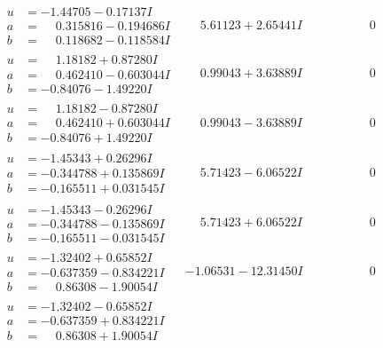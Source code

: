 \documentclass[1p]{elsarticle_modified}
\theoremstyle{definition}
\begin{document}
$$\begin{array}{c|c|c}
\begin{aligned}
u &= -1.44705 - 0.17137 I \\
a &= \phantom{-}0.315816 - 0.194686 I \\
b &= \phantom{-}0.118682 - 0.118584 I\end{aligned}
 & \phantom{-}5.61123 + 2.65441 I & \phantom{-0.000000 } 0 \\ \hline\begin{aligned}
u &= \phantom{-}1.18182 + 0.87280 I \\
a &= \phantom{-}0.462410 - 0.603044 I \\
b &= -0.84076 - 1.49220 I\end{aligned}
 & \phantom{-}0.99043 + 3.63889 I & \phantom{-0.000000 } 0 \\ \hline\begin{aligned}
u &= \phantom{-}1.18182 - 0.87280 I \\
a &= \phantom{-}0.462410 + 0.603044 I \\
b &= -0.84076 + 1.49220 I\end{aligned}
 & \phantom{-}0.99043 - 3.63889 I & \phantom{-0.000000 } 0 \\ \hline\begin{aligned}
u &= -1.45343 + 0.26296 I \\
a &= -0.344788 + 0.135869 I \\
b &= -0.165511 + 0.031545 I\end{aligned}
 & \phantom{-}5.71423 - 6.06522 I & \phantom{-0.000000 } 0 \\ \hline\begin{aligned}
u &= -1.45343 - 0.26296 I \\
a &= -0.344788 - 0.135869 I \\
b &= -0.165511 - 0.031545 I\end{aligned}
 & \phantom{-}5.71423 + 6.06522 I & \phantom{-0.000000 } 0 \\ \hline\begin{aligned}
u &= -1.32402 + 0.65852 I \\
a &= -0.637359 - 0.834221 I \\
b &= \phantom{-}0.86308 - 1.90054 I\end{aligned}
 & -1.06531 - 12.31450 I & \phantom{-0.000000 } 0 \\ \hline\begin{aligned}
u &= -1.32402 - 0.65852 I \\
a &= -0.637359 + 0.834221 I \\
b &= \phantom{-}0.86308 + 1.90054 I\end{aligned}

\end{array}$$
\end{document}

